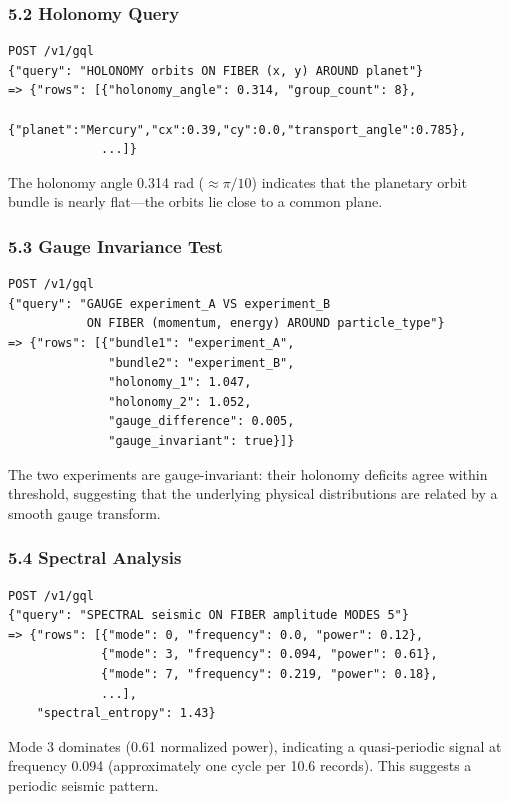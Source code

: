 \documentclass[11pt,letterpaper]{article}
\begin{document}
\subsubsection*{5.2 Holonomy Query}

\begin{lstlisting}
POST /v1/gql
{"query": "HOLONOMY orbits ON FIBER (x, y) AROUND planet"}
=> {"rows": [{"holonomy_angle": 0.314, "group_count": 8},
             {"planet":"Mercury","cx":0.39,"cy":0.0,"transport_angle":0.785},
             ...]}
\end{lstlisting}

The holonomy angle 0.314 rad ($\approx \pi/10$) indicates that the planetary orbit bundle is nearly flat---the orbits lie close to a common plane.


\subsubsection*{5.3 Gauge Invariance Test}

\begin{lstlisting}
POST /v1/gql
{"query": "GAUGE experiment_A VS experiment_B
           ON FIBER (momentum, energy) AROUND particle_type"}
=> {"rows": [{"bundle1": "experiment_A",
              "bundle2": "experiment_B",
              "holonomy_1": 1.047,
              "holonomy_2": 1.052,
              "gauge_difference": 0.005,
              "gauge_invariant": true}]}
\end{lstlisting}

The two experiments are gauge-invariant: their holonomy deficits agree within threshold, suggesting that the underlying physical distributions are related by a smooth gauge transform.


\subsubsection*{5.4 Spectral Analysis}

\begin{lstlisting}
POST /v1/gql
{"query": "SPECTRAL seismic ON FIBER amplitude MODES 5"}
=> {"rows": [{"mode": 0, "frequency": 0.0, "power": 0.12},
             {"mode": 3, "frequency": 0.094, "power": 0.61},
             {"mode": 7, "frequency": 0.219, "power": 0.18},
             ...],
    "spectral_entropy": 1.43}
\end{lstlisting}

Mode 3 dominates (0.61 normalized power), indicating a quasi-periodic signal at frequency 0.094 (approximately one cycle per 10.6 records). This suggests a periodic seismic pattern.
\end{document}
